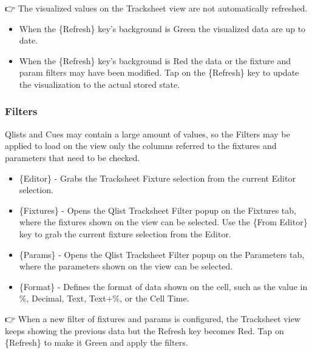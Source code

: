 \documentclass[
]{article}
\providecommand{\tightlist}{%
  \setlength{\itemsep}{0pt}\setlength{\parskip}{0pt}}
\begin{document}
👉 The visualized values on the Tracksheet view are not automatically refreshed.

\begin{itemize}
\item
  When the \{Refresh\} key's background is Green the visualized data are up to date.
\item
  When the \{Refresh\} key's background is Red the data or the fixture and param filters may have been modified. Tap on the \{Refresh\} key to update the visualization to the actual stored state.
\end{itemize}

\hypertarget{filters}{%
\subsubsection{Filters}\label{filters}}

Qlists and Cues may contain a large amount of values, so the Filters may be applied to load on the view only the columns referred to the fixtures and parameters that need to be checked.

\begin{itemize}
\item
  \{Editor\} - Grabs the Tracksheet Fixture selection from the current Editor selection.
\item
  \{Fixtures\} - Opens the Qlist Tracksheet Filter popup on the Fixtures tab, where the fixtures shown on the view can be selected. Use the \{From Editor\} key to grab the current fixture selection from the Editor.
\end{itemize}

\begin{itemize}
\tightlist
\item
  \{Params\} - Opens the Qlist Tracksheet Filter popup on the Parameters tab, where the parameters shown on the view can be selected.
\end{itemize}

\begin{itemize}
\tightlist
\item
  \{Format\} - Defines the format of data shown on the cell, such as the value in \%, Decimal, Text, Text+\%, or the Cell Time.
\end{itemize}

👉 When a new filter of fixtures and params is configured, the Tracksheet view keeps showing the previous data but the Refresh key becomes Red. Tap on \{Refresh\} to make it Green and apply the filters.
\end{document}
